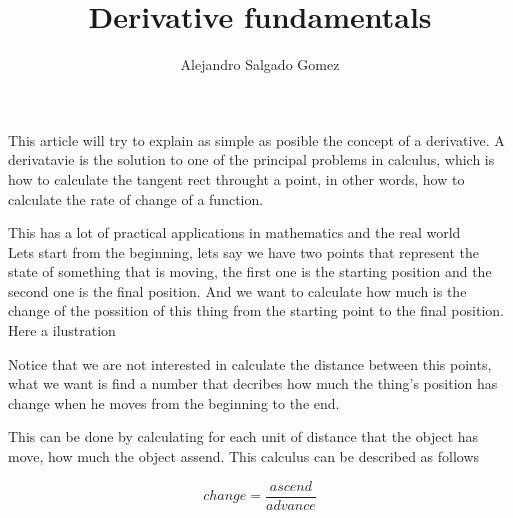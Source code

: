 \documentclass[12pt,journal]{IEEEtran}
\begin{document}
    \title{Derivative fundamentals}
    \author{Alejandro Salgado Gomez}

    \maketitle

    This article will try to explain as simple as posible the concept of a
    derivative. A derivatavie is the solution to one of the principal
    problems in calculus, which is how to calculate the tangent rect throught
    a point, in other words, how to calculate the rate of change of a function.

    This has a lot of practical applications in mathematics and the real
    world\\

    Lets start from the beginning, lets say we have two points that represent
    the state of something that is moving, the first one is the starting
    position and the second one is the final position. And we want to calculate
    how much is the change of the possition of this thing from the starting
    point to the final position. Here a ilustration


    Notice that we are not interested in calculate the distance between this
    points, what we want is find a number that decribes how much the thing's
    position has change when he moves from the beginning to the end.

    This can be done by calculating for each unit of distance that the object
    has move, how much the object assend. This calculus can be  described as
    follows

    \begin{equation}
        change = \frac{ascend}{advance}
    \end{equation}
\end{document}
